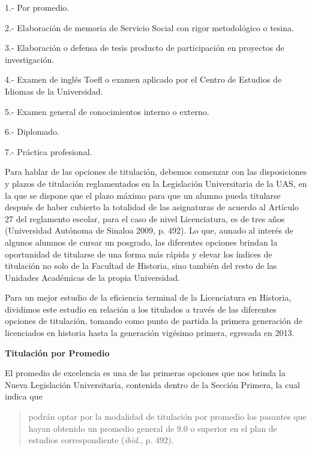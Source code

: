 \begin{Obs}
\item[1.-] Por promedio.
\item[2.-] Elaboración de memoria de Servicio Social con rigor metodológico o
tesina.
\item[3.-] Elaboración o defensa de tesis producto de participación en proyectos de
investigación.
\item[4.-] Examen de inglés Toefl o examen aplicado por el Centro de Estudios de
Idiomas de la Universidad. 
\item[5.-] Examen general de conocimientos interno o externo.
\item[6.-] Diplomado.
\item[7.-] Práctica profesional.
\end{Obs}


Para hablar de las opciones de titulación, debemos comenzar con las
disposiciones y plazos de titulación reglamentados en la Legislación
Universitaria  de la UAS, en la que se dispone que el plazo máximo para que
un alumno pueda titularse después de haber cubierto la totalidad de las
asignaturas de acuerdo al Artículo 27 del reglamento escolar, para el caso
de nivel Licenciatura, es de tres años (Universidad Autónoma de
Sinaloa 2009, p. 492).  Lo que, aunado al interés de algunos alumnos de 
cursar un posgrado, las
diferentes opciones brindan la oportunidad de titularse de una forma más
rápida y elevar los índices de titulación no solo de la Facultad de
Historia, sino también del resto de las Unidades Académicas de la propia
Universidad.

Para un mejor estudio de la eficiencia terminal de la Licenciatura en
Historia, dividimos este estudio en relación a los titulados a través de
las diferentes opciones de titulación, tomando como punto de partida la
primera generación de licenciados en historia hasta la generación vigésimo
primera, egresada en 2013.

\medskip
{\bfseries Titulación por Promedio}
\enlargethispage{1\baselineskip}
 
El promedio de excelencia es una de las primeras opciones que nos brinda la
Nueva Legislación Universitaria, contenida dentro de la Sección Primera, la
cual indica que

\begin{quotation}
podrán optar por la modalidad de titulación por promedio los pasantes que
hayan obtenido un promedio general de 9.0 o superior en el plan de estudios
correspondiente (\textit{ibid.}, p. 492).
\end{quotation}

